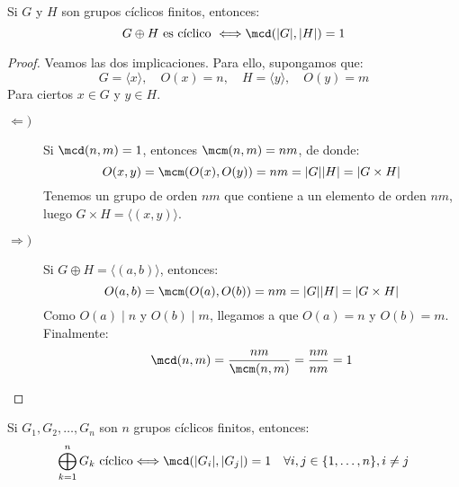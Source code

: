 \begin{prop}\label{prop:carac_prod_finito_ciclicos}
    Si $G$ y $H$ son grupos cíclicos finitos, entonces:
    \begin{equation*}
        G\oplus H \text{\ es cíclico\ } \Longleftrightarrow \mcd(|G|,|H|) = 1
    \end{equation*}
    \begin{proof}
        Veamos las dos implicaciones. Para ello, supongamos que:
        \begin{equation*}
            G = \langle x \rangle,  \quad O(x) = n, \quad H = \langle y \rangle , \quad O(y) = m
        \end{equation*}
        Para ciertos $x\in G$ y $y\in H$.
        \begin{description}
            \item [$\Longleftarrow)$] Si $\mcd(n,m) = 1$, entonces $\mcm(n,m) = nm$, de donde:
                \begin{equation*}
                    O(x,y) = \mcm(O(x), O(y)) = nm = |G||H| = |G\times H|
                \end{equation*}
                Tenemos un grupo de orden $nm$ que contiene a un elemento de orden $nm$, luego $G\times H = \langle (x,y) \rangle $.
            \item [$\Longrightarrow)$] Si $G\oplus H = \langle (a,b) \rangle $, entonces:
                \begin{equation*}
                    O(a,b) = \mcm(O(a), O(b)) = nm = |G||H| = |G\times H|
                \end{equation*}
                Como $O(a) \mid n$ y $O(b) \mid m$, llegamos a que $O(a) = n$ y $O(b) = m$. Finalmente:
                \begin{equation*}
                    \mcd(n,m) = \dfrac{nm}{\mcm(n,m)} = \dfrac{nm}{nm} = 1
                \end{equation*}
        \end{description}
    \end{proof}
\end{prop}

\begin{coro}
    Si $G_1,G_2,\ldots, G_n$ son $n$ grupos cíclicos finitos, entonces:
    \begin{equation*}
        \bigoplus_{k=1}^n G_k \text{\ cíclico} \Longleftrightarrow \mcd(|G_i|,|G_j|) = 1 \quad \forall i,j \in \{1,\ldots,n\}, i\neq j
    \end{equation*}
\end{coro}

